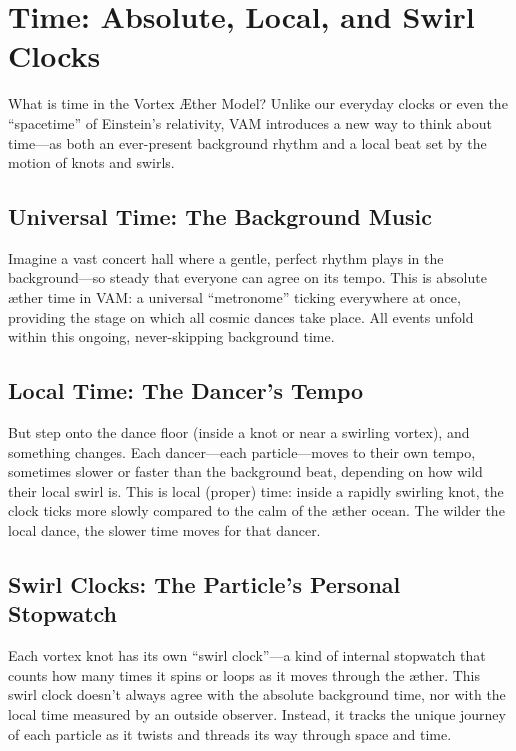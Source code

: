 
\section{Time: Absolute, Local, and Swirl Clocks}

What is time in the Vortex Æther Model? Unlike our everyday clocks or even the “spacetime” of Einstein’s relativity, VAM introduces a new way to think about time—as both an ever-present background rhythm and a local beat set by the motion of knots and swirls.


\subsection*{Universal Time: The Background Music}

Imagine a vast concert hall where a gentle, perfect rhythm plays in the background—so steady that everyone can agree on its tempo. This is absolute æther time in VAM: a universal “metronome” ticking everywhere at once, providing the stage on which all cosmic dances take place. All events unfold within this ongoing, never-skipping background time.


\subsection*{Local Time: The Dancer’s Tempo}

But step onto the dance floor (inside a knot or near a swirling vortex), and something changes. Each dancer—each particle—moves to their own tempo, sometimes slower or faster than the background beat, depending on how wild their local swirl is. This is local (proper) time: inside a rapidly swirling knot, the clock ticks more slowly compared to the calm of the æther ocean. The wilder the local dance, the slower time moves for that dancer.


\subsection*{Swirl Clocks: The Particle’s Personal Stopwatch}

Each vortex knot has its own “swirl clock”—a kind of internal stopwatch that counts how many times it spins or loops as it moves through the æther. This swirl clock doesn’t always agree with the absolute background time, nor with the local time measured by an outside observer. Instead, it tracks the unique journey of each particle as it twists and threads its way through space and time.


